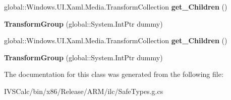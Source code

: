 \begin{DoxyCompactItemize}
global\+::\+Windows.\+U\+I.\+Xaml.\+Media.\+Transform\+Collection {\bfseries get\+\_\+\+Children} ()
\item 
\mbox{\label{class_windows_1_1_u_i_1_1_xaml_1_1_media_1_1_transform_group_a79af706bb0944f29556aa089b751c0f2}} 
{\bfseries Transform\+Group} (global\+::\+System.\+Int\+Ptr dummy)
\item 
\mbox{\label{class_windows_1_1_u_i_1_1_xaml_1_1_media_1_1_transform_group_ac0e4bc5659ceface6cd1574a3b969d17}} 
global\+::\+Windows.\+U\+I.\+Xaml.\+Media.\+Transform\+Collection {\bfseries get\+\_\+\+Children} ()
\item 
\mbox{\label{class_windows_1_1_u_i_1_1_xaml_1_1_media_1_1_transform_group_a79af706bb0944f29556aa089b751c0f2}} 
{\bfseries Transform\+Group} (global\+::\+System.\+Int\+Ptr dummy)
\end{DoxyCompactItemize}


The documentation for this class was generated from the following file\+:\begin{DoxyCompactItemize}
\item 
I\+V\+S\+Calc/bin/x86/\+Release/\+A\+R\+M/ilc/Safe\+Types.\+g.\+cs\end{DoxyCompactItemize}
